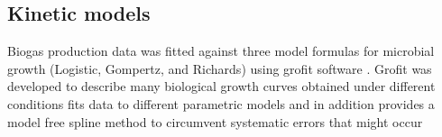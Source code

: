 \subsection{Kinetic models}
Biogas production data was fitted against three model formulas for microbial growth (Logistic, Gompertz, and Richards) using grofit software \cite{Kahm_2010}. Grofit was developed to describe many biological growth curves obtained under different conditions fits data to different parametric models and in
addition provides a model free spline method to circumvent systematic errors that might
occur